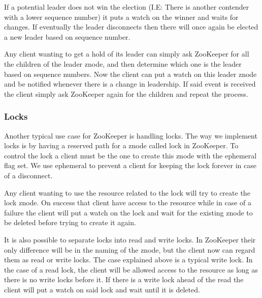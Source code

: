 If a potential leader does not win the election (I.E: There is another contender with a lower sequence number) it puts a watch on the winner and waits for changes. If eventually the leader disconnects then there will once again be elected a new leader based on sequence number.

Any client wanting to get a hold of its leader can simply ask ZooKeeper for all the children of the leader znode, and then determine which one is the leader based on sequence numbers. Now the client can put a watch on this leader znode and be notified whenever there is a change in leadership. If said event is received the client simply ask ZooKeeper again for the children and repeat the process.

\subsubsection{Locks}
Another typical use case for ZooKeeper is handling locks. The way we implement locks is by having a reserved path for a znode called lock in ZooKeeper. To control the lock a client must be the one to create this znode with the ephemeral flag set. We use ephemeral to prevent a client for keeping the lock forever in case of a disconnect. 

Any client wanting to use the resource related to the lock will try to create the lock znode. On success that client have access to the resource while in case of a failure the client will put a watch on the lock and wait for the existing znode to be deleted before trying to create it again.

It is also possible to separate locks into read and write locks. In ZooKeeper their only difference will be in the naming of the znode, but the client now can regard them as read or write locks. The case explained above is a typical write lock. In the case of a read lock, the client will be allowed access to the resource as long as there is no write locks before it. If there is a write lock ahead of the read the client will put a watch on said lock and wait until it is deleted. 






 
